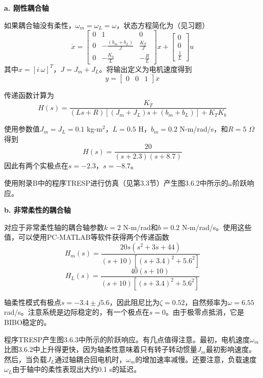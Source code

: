 \documentclass[12pt,a4paper]{ctexart}
\begin{document}
\textbf{a. 刚性耦合轴}

如果耦合轴没有柔性，$\omega_m = \omega_L = \omega$，状态方程简化为（见习题）
\begin{equation}
\dot{x} = \begin{bmatrix} 0 & 1 & 0 \\ 0 & -\frac{(b_m+b_L)}{J} & \frac{K_T}{J} \\ 0 & -\frac{K_b}{L} & -\frac{R}{L} \end{bmatrix}x + \begin{bmatrix} 0 \\ 0 \\ \frac{1}{L} \end{bmatrix}u
\end{equation}
其中$x = [i \ \omega]^T$，$J = J_m + J_L$。将输出定义为电机速度得到
\begin{equation}
y = \begin{bmatrix} 0 & 0 & 1 \end{bmatrix}x
\end{equation}

传递函数计算为
\begin{equation}
H(s) = \frac{K_T}{(Ls+R)[(J_m+J_L)s+(b_m+b_L)] + K_T K_b}
\end{equation}

使用参数值$J_m = J_L = 0.1$ kg-m$^2$，$L = 0.5$ H，$b_m = 0.2$ N-m/rad/s，和$R = 5$ $\Omega$得到
\begin{equation}
H(s) = \frac{20}{(s+2.3)(s+8.7)}
\end{equation}
因此有两个实极点在$s = -2.3$，$s = -8.7$。

使用附录B中的程序TRESP进行仿真（见第3.3节）产生图3.6.2中所示的$\omega$阶跃响应。

\textbf{b. 非常柔性的耦合轴}

对应于非常柔性轴的耦合轴参数$k = 2$ N-m/rad和$b = 0.2$ N-m/rad/s。使用这些值，可以使用PC-MATLAB等软件获得两个传递函数
\begin{equation}
H_m(s) = \frac{20s(s^2+3s+44)}{(s+10)[(s+3.4)^2+5.6^2]}
\end{equation}
\begin{equation}
H_L(s) = \frac{40(s+10)}{(s+10)[(s+3.4)^2+5.6^2]}
\end{equation}

轴柔性模式有极点$s = -3.4 \pm j5.6$，因此阻尼比为$\zeta = 0.52$，自然频率为$\omega = 6.55$ rad/s。注意系统是边际稳定的，有一个极点在$s = 0$。由于极零点抵消，它是BIBO稳定的。

程序TRESP产生图3.6.3中所示的阶跃响应。有几点值得注意。最初，电机速度$\omega_m$比图3.6.2中上升得更快，因为轴柔性意味着只有转子转动惯量$J_m$最初影响速度。然后，当负载$J_L$通过轴耦合回电机时，$\omega_m$的增加速率减慢。还要注意，负载速度$\omega_L$由于轴中的柔性表现出大约0.1 s的延迟。
\end{document}
